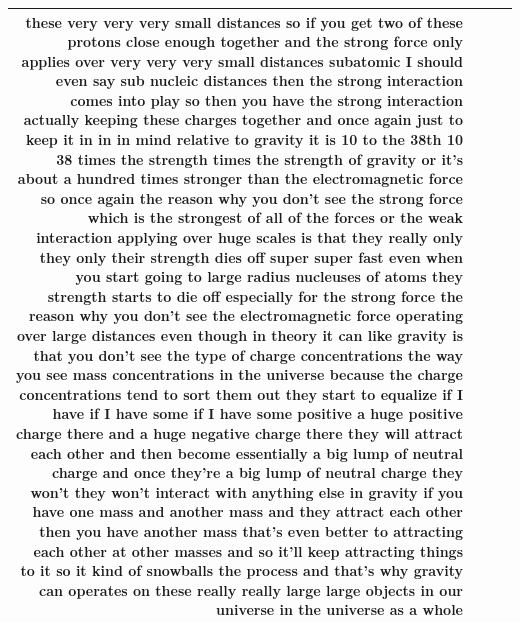 \documentclass[10pt]{article}
\begin{document}
\begin{tiny}
\begin{longtable}{|r|p{0.375in}|p{1.275in}|p{3.5in}|}
these very very very small distances so if you get two of these protons close enough together and the strong force only applies over very very very small distances subatomic I should even say sub nucleic distances then the strong interaction comes into play so then you have the strong interaction actually keeping these charges together and once again just to keep it in in in mind relative to gravity it is 10 to the 38th 10 38 times the strength times the strength of gravity or it's about a hundred times stronger than the electromagnetic force so once again the reason why you don't see the strong force which is the strongest of all of the forces or the weak interaction applying over huge scales is that they really only they only their strength dies off super super fast even when you start going to large radius nucleuses of atoms they strength starts to die off especially for the strong force the reason why you don't see the electromagnetic force operating over large distances even though in theory it can like gravity is that you don't see the type of charge concentrations the way you see mass concentrations in the universe because the charge concentrations tend to sort them out they start to equalize if I have if I have some if I have some positive a huge positive charge there and a huge negative charge there they will attract each other and then become essentially a big lump of neutral charge and once they're a big lump of neutral charge they won't they won't interact with anything else in gravity if you have one mass and another mass and they attract each other then you have another mass that's even better to attracting each other at other masses and so it'll keep attracting things to it so it kind of snowballs the process and that's why gravity can operates on these really really large large objects in our universe in the universe as a whole \\\hline

\end{longtable}
\end{tiny}
\end{document}
